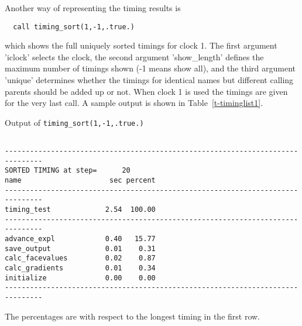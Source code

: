 Another way of representing the timing results is
\begin{verbatim}
  call timing_sort(1,-1,.true.)
\end{verbatim}
which shows the full uniquely sorted timings for clock 1. 
The first argument 'iclock' selects the clock, the second argument 
'show\_length' defines the maximum number of timings shown 
(-1 means show all), 
and the third argument 'unique' determines whether
the timings for identical names but different calling parents
should be added up or not. 
When clock 1 is used the timings are given for the very last call.
A sample output is shown in Table~\ref{t-timinglist1}.
\begin{table}
\caption{Output of {\tt timing\_sort(1,-1,.true.)}}
{\footnotesize
\begin{verbatim}

-------------------------------------------------------------------------------
SORTED TIMING at step=      20
name                     sec percent
-------------------------------------------------------------------------------
timing_test             2.54  100.00
-------------------------------------------------------------------------------
advance_expl            0.40   15.77
save_output             0.01    0.31
calc_facevalues         0.02    0.87
calc_gradients          0.01    0.34
initialize              0.00    0.00
-------------------------------------------------------------------------------

\end{verbatim}
}
\label{t-timinglist1}
\end{table}
The percentages are with respect to the longest timing in the first row.

